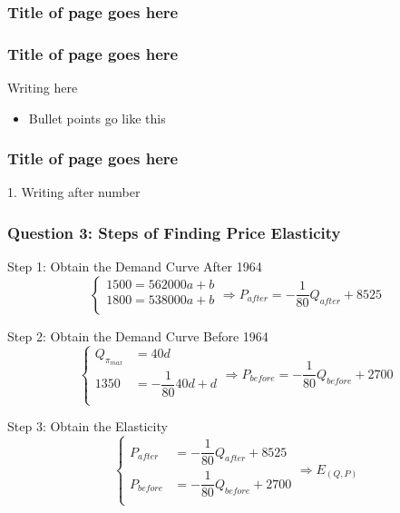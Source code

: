 \documentclass{beamer}
\begin{document}
\begin{frame}
\frametitle{Title of page goes here}



\begin{itemize}
\end{itemize}
\end{frame}


\begin{frame}
\frametitle{Title of page goes here}

Writing here

\begin{itemize}
\item Bullet points go like this
\end{itemize}
\end{frame}


\begin{frame}
\frametitle{Title of page goes here}

1. Writing after number
\end{frame}



\begin{frame}
\frametitle{Question 3: Steps of Finding Price Elasticity}
\begin{block}{Step 1: Obtain the Demand Curve After 1964}
$$ \left\{
\begin{aligned}
1500 = 562000a + b\\
1800 = 538000a + b\\
\end{aligned}
\right.\Rightarrow
P_{\textit{after}} = -\dfrac{1}{80} Q_{\textit{after}} + 8525
$$
\end{block}

\begin{block}{Step 2: Obtain the Demand Curve Before 1964}
$$ \left\{
\begin{aligned}
Q_{\pi_{max}} &= 40d\\
1350 &= -\dfrac{1}{80} 40d + d\\
\end{aligned}
\right.\Rightarrow
P_{\textit{before}} = -\dfrac{1}{80} Q_{\textit{before}} + 2700
$$
\end{block}

\begin{block}{Step 3: Obtain the Elasticity}
$$ \left\{
\begin{aligned}
P_{\textit{after}} &= -\dfrac{1}{80} Q_{\textit{after}} + 8525\\
P_{\textit{before}} &= -\dfrac{1}{80} Q_{\textit{before}} + 2700\\
\end{aligned}
\right.\Rightarrow
E_{(Q,P)}
$$
\end{block}
\end{frame}
\end{document}
